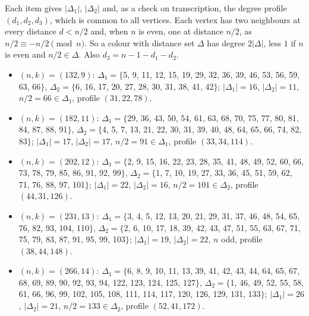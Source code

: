 \documentclass[11pt]{article}
\theoremstyle{spacedplain}
\theoremstyle{spaceddef}
\theoremstyle{spacedremark}
\begin{document}
Each item gives $|\Delta_1|$, $|\Delta_2|$ and, as a check on transcription, the degree profile $(d_1,d_2,d_3)$, which is common to all vertices.
Each vertex has two neighbours at every distance $d<n/2$ and, when $n$ is even, one at distance $n/2$, as $n/2\equiv-n/2\pmod n$.
So a colour with distance set $\Delta$ has degree $2|\Delta|$, less $1$ if $n$ is even and $n/2\in\Delta$.
Also $d_3=n-1-d_1-d_2$.
\begin{itemize}[leftmargin=1.2em]\small
\item $(n,k)=(132,9)$: $\Delta_1=\{$5, 9, 11, 12, 15, 19, 29, 32, 36, 39, 46, 53, 56, 59, 63, 66$\}$, $\Delta_2=\{$6, 16, 17, 20, 27, 28, 30, 31, 38, 41, 42$\}$; $|\Delta_1|=16$, $|\Delta_2|=11$, $n/2=66\in\Delta_1$, profile $(31,22,78)$.
\item $(n,k)=(182,11)$: $\Delta_1=\{$29, 36, 43, 50, 54, 61, 63, 68, 70, 75, 77, 80, 81, 84, 87, 88, 91$\}$, $\Delta_2=\{$4, 5, 7, 13, 21, 22, 30, 31, 39, 40, 48, 64, 65, 66, 74, 82, 83$\}$; $|\Delta_1|=17$, $|\Delta_2|=17$, $n/2=91\in\Delta_1$, profile $(33,34,114)$.
\item $(n,k)=(202,12)$: $\Delta_1=\{$2, 9, 15, 16, 22, 23, 28, 35, 41, 48, 49, 52, 60, 66, 73, 78, 79, 85, 86, 91, 92, 99$\}$, $\Delta_2=\{$1, 7, 10, 19, 27, 33, 36, 45, 51, 59, 62, 71, 76, 88, 97, 101$\}$; $|\Delta_1|=22$, $|\Delta_2|=16$, $n/2=101\in\Delta_2$, profile $(44,31,126)$.
\item $(n,k)=(231,13)$: $\Delta_1=\{$3, 4, 5, 12, 13, 20, 21, 29, 31, 37, 46, 48, 54, 65, 76, 82, 93, 104, 110$\}$, $\Delta_2=\{$2, 6, 10, 17, 18, 39, 42, 43, 47, 51, 55, 63, 67, 71, 75, 79, 83, 87, 91, 95, 99, 103$\}$; $|\Delta_1|=19$, $|\Delta_2|=22$, $n$ odd, profile $(38,44,148)$.
\item $(n,k)=(266,14)$: $\Delta_1=\{$6, 8, 9, 10, 11, 13, 39, 41, 42, 43, 44, 64, 65, 67, 68, 69, 89, 90, 92, 93, 94, 122, 123, 124, 125, 127$\}$, $\Delta_2=\{$1, 46, 49, 52, 55, 58, 61, 66, 96, 99, 102, 105, 108, 111, 114, 117, 120, 126, 129, 131, 133$\}$; $|\Delta_1|=26$, $|\Delta_2|=21$, $n/2=133\in\Delta_2$, profile $(52,41,172)$.
\end{itemize}
\end{document}
